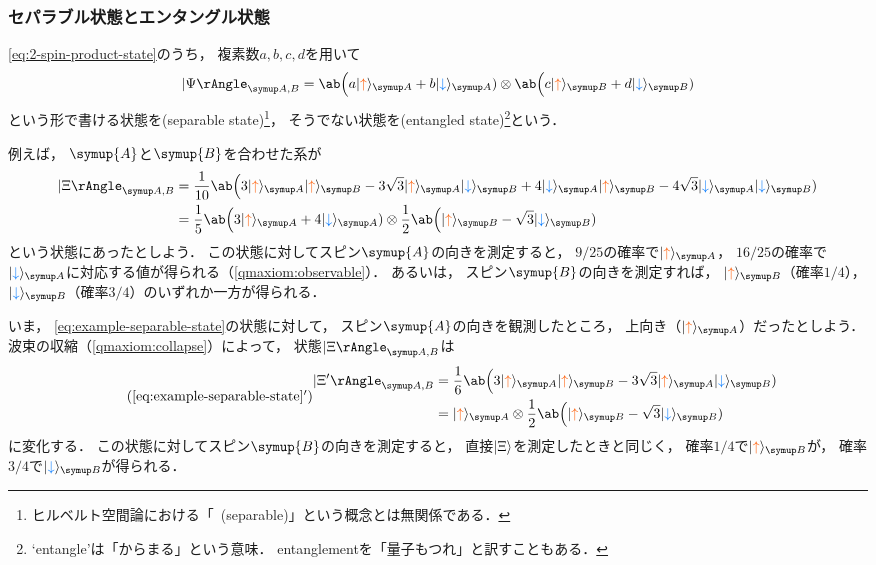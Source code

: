 \documentclass[
]{sotsu}
\newcommand{\bitone}{\mathcolor{fire}{\uparrow}}
\newcommand{\bittwo}{\mathcolor{water}{\downarrow}}
\begin{document}
\subsubsection{セパラブル状態とエンタングル状態}
\label{sec:entangled-state}

\cref{eq:2-spin-product-state}のうち，
複素数$a, b, c, d$を用いて
\begin{equation}
    \Ket{\Psi}<A,B> = 
        \ab\Big( a \ket{\bitone}<A> + b \ket{\bittwo}<A> )
        \otimes 
        \ab\Big( c \ket{\bitone}<B> + d \ket{\bittwo}<B> )
\end{equation}
という形で書ける状態を(separable state)\footnote{
    ヒルベルト空間論における「~(separable)」という概念とは無関係である．
}，
そうでない状態を(entangled state)\footnote{
    `entangle'は「からまる」という意味．
    entanglementを「量子もつれ」と訳すこともある．
}という．



\quad 
例えば，
$\symup{A}$と$\symup{B}$を合わせた系が
\begin{equation}
    \label{eq:example-separable-state}
    \begin{split}
        \Ket{\Xi}<A,B>
        &= \frac{1}{10} \ab\Big(
              3 \ket{\bitone}<A> \ket{\bitone}<B>
            - 3\sqrt{3} \ket{\bitone}<A> \ket{\bittwo}<B>
            + 4 \ket{\bittwo}<A> \ket{\bitone}<B>
            - 4\sqrt{3} \ket{\bittwo}<A> \ket{\bittwo}<B>
        )
        \\
        &= \frac{1}{5} \ab\Big( 3 \ket{\bitone}<A> + 4 \ket{\bittwo}<A> )
            \otimes 
           \frac{1}{2} \ab\Big( \ket{\bitone}<B> - \sqrt{3} \ket{\bittwo}<B> )
    \end{split}
\end{equation}
という状態にあったとしよう．
この状態に対してスピン$\symup{A}$の向きを測定すると，
$9/25$の確率で$\ket{\bitone}<A>$，
$16/25$の確率で$\ket{\bittwo}<A>$に対応する値が得られる（\cref{qmaxiom:observable}）．
あるいは，
スピン$\symup{B}$の向きを測定すれば，
$\ket{\bitone}<B>$（確率$1/4$），
$\ket{\bittwo}<B>$（確率$3/4$）のいずれか一方が得られる．

いま，
\cref{eq:example-separable-state}の状態に対して，
スピン$\symup{A}$の向きを観測したところ，
上向き（$\ket{\bitone}<A>$）だったとしよう．
波束の収縮（\cref{qmaxiom:collapse}）によって，
状態$\Ket{\Xi}<A,B>$は
\begin{equation*}
    \tag{\ref*{eq:example-separable-state}$'$}
    \begin{split}
        \Ket{\Xi'}<A,B>
        &= \frac{1}{6} \ab\Big(
            3 \ket{\bitone}<A> \ket{\bitone}<B>
            - 3 \sqrt{3} \ket{\bitone}<A> \ket{\bittwo}<B>
        )
        \\
        &= \ket{\bitone}<A>
            \otimes 
           \frac{1}{2} \ab\Big( \ket{\bitone}<B> - \sqrt{3} \ket{\bittwo}<B> )
    \end{split}
\end{equation*}
に変化する．
この状態に対してスピン$\symup{B}$の向きを測定すると，
直接$\ket{\Xi}$を測定したときと同じく，
確率$1/4$で$\ket{\bitone}<B>$が，
確率$3/4$で$\ket{\bittwo}<B>$が得られる．
\end{document}
